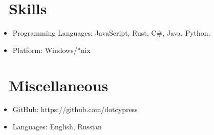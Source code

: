 \documentclass{resume}
\begin{document}
\section{\faCogs\ Skills}
\begin{itemize}[parsep=0.5ex]
  \item Programming Languages: JavaScript, Rust, C#, Java, Python.
  \item Platform: Windows/*nix
\end{itemize}

\section{\faInfo\ Miscellaneous}
\begin{itemize}[parsep=0.5ex]
  \item GitHub: https://github.com/dotcypress
  \item Languages: English, Russian
\end{itemize}

%
%
\end{document}
